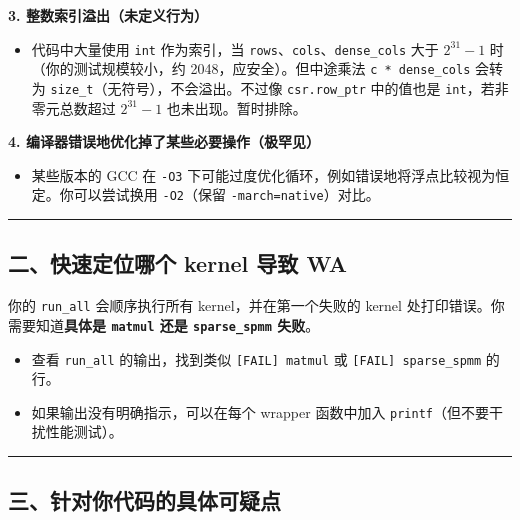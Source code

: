 \documentclass[11pt, a4paper]{article}
\begin{document}
\begin{aibox}
\vspace{0.5em}
\textbf{3. 整数索引溢出（未定义行为）}
\begin{itemize}
    \item 代码中大量使用 \texttt{int} 作为索引，当 \texttt{rows}、\texttt{cols}、\texttt{dense\_cols} 大于 $2^{31}-1$ 时（你的测试规模较小，约 2048，应安全）。但中途乘法 \texttt{c * dense\_cols} 会转为 \texttt{size\_t}（无符号），不会溢出。不过像 \texttt{csr.row\_ptr} 中的值也是 \texttt{int}，若非零元总数超过 $2^{31}-1$ 也未出现。暂时排除。
\end{itemize}

\vspace{0.5em}
\textbf{4. 编译器错误地优化掉了某些必要操作（极罕见）}
\begin{itemize}
    \item 某些版本的 GCC 在 \texttt{-O3} 下可能过度优化循环，例如错误地将浮点比较视为恒定。你可以尝试换用 \texttt{-O2}（保留 \texttt{-march=native}）对比。
\end{itemize}

\begin{center}\rule{\textwidth}{0.4pt}\end{center}

\subsection*{二、快速定位哪个 kernel 导致 WA}

你的 \texttt{run\_all} 会顺序执行所有 kernel，并在第一个失败的 kernel 处打印错误。你需要知道\textbf{具体是 \texttt{matmul} 还是 \texttt{sparse\_spmm} 失败}。
\begin{itemize}
    \item 查看 \texttt{run\_all} 的输出，找到类似 \texttt{[FAIL] matmul} 或 \texttt{[FAIL] sparse\_spmm} 的行。
    \item 如果输出没有明确指示，可以在每个 wrapper 函数中加入 \texttt{printf}（但不要干扰性能测试）。
\end{itemize}

\begin{center}\rule{\textwidth}{0.4pt}\end{center}

\subsection*{三、针对你代码的具体可疑点}


\end{aibox}
\end{document}
